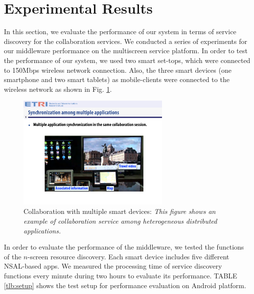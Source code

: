 \documentclass[conference]{IEEEtran}
\begin{document}
\section{Experimental Results}
\label{sc:Experiments}
In this section, we evaluate the performance of our system in terms of service discovery for the collaboration services. 
We conducted a series of experiments for our middleware performance  on the multiscreen service platform. 
In order to test the performance of our system, we used two smart set-tops, 
which were connected to 150Mbps wireless network connection. Also, the three smart devices (one smartphone and two smart tablets) as mobile-clients 
were connected to the wireless network as shown in Fig. \ref{fig:multiplecollaboration}. 
    \begin{figure}[htb] %
    \centering
    \includegraphics[width=7.5cm,keepaspectratio]{multiplecollaboration_2}
    \caption{Collaboration with multiple smart devices: \emph{This figure shows an example of collaboration service among heterogeneous distributed applications.}}
    \label{fig:multiplecollaboration}
    \end{figure}

In order to evaluate the performance of the middleware, we tested the functions of the $n$-screen resource discovery. Each
smart device includes five different NSAL-based apps. We measured the processing time of service discovery functions every minute during two hours to evaluate its performance. TABLE \ref{tlb:setup} shows the test setup for performance evaluation on Android platform.

    \begin{table}[htb]
    \caption{Test Setup for Performance Evaluation}
    \label{tlb:setup}
    \end{table}
\end{document}
